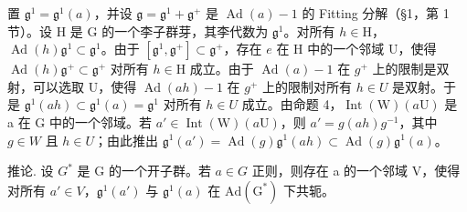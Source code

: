 置 \(\mathfrak{g}^1 = \mathfrak{g}^1(a)\)，并设 \(\mathfrak{g} = \mathfrak{g}^1 + \mathfrak{g}^+\) 是 \(\operatorname{Ad}(a) - 1\) 的 Fitting 分解（§1，第 1 节）。设 H 是 G 的一个李子群芽，其李代数为 \(\mathfrak{g}^1\)。对所有 \(h \in \mathrm{H}\)，\(\operatorname{Ad}(h)\mathfrak{g}^1 \subset \mathfrak{g}^1\)。由于 \([\mathfrak{g}^1, \mathfrak{g}^+] \subset \mathfrak{g}^+\)，存在 \(e\) 在 H 中的一个邻域 U，使得 \(\operatorname{Ad}(h)\mathfrak{g}^+ \subset \mathfrak{g}^+\) 对所有 \(h \in \mathrm{H}\) 成立。由于 \(\operatorname{Ad}(a)-1\) 在 \(g^{+}\) 上的限制是双射，可以选取 U，使得 \(\operatorname{Ad}(ah)-1\) 在 \(g^{+}\) 上的限制对所有 \(h\in U\) 是双射。于是 \(\mathfrak{g}^{1}(ah)\subset\mathfrak{g}^{1}(a)=\mathfrak{g}^{1}\) 对所有 \(h\in U\) 成立。由命题 4，\(\operatorname{Int}(\mathrm{W})(a\mathrm{U})\) 是 a 在 G 中的一个邻域。若 \(a'\in\operatorname{Int}(\mathrm{W})(a\mathrm{U})\)，则 \(a'=g(ah)g^{-1}\)，其中 \(g\in W\) 且 \(h\in U\)；由此推出 \(\mathfrak{g}^{1}(a')=\operatorname{Ad}(g)\mathfrak{g}^{1}(ah)\subset\operatorname{Ad}(g)\mathfrak{g}^{1}(a)\)。

推论. 设 \(G^{*}\) 是 G 的一个开子群。若 \(a \in G\) 正则，则存在 a 的一个邻域 V，使得对所有 \(a' \in V\)，\(\mathfrak{g}^{1}(a')\) 与 \(\mathfrak{g}^{1}(a)\) 在 \(\mathrm{Ad}(\mathrm{G}^{*})\) 下共轭。

